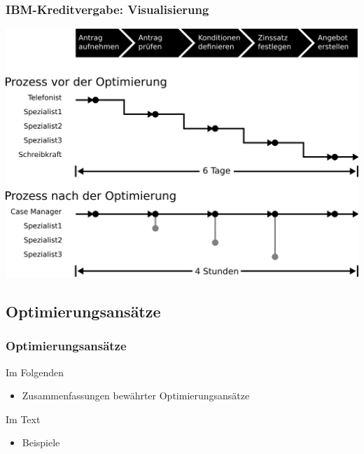 \documentclass{beamer}
\begin{document}
 \begin{frame}
  \frametitle{IBM-Kreditvergabe: Visualisierung}
  \includegraphics[scale=2.5]{4_5.png}
 \end{frame}

 \subsection{Optimierungsansätze}
 \begin{frame}
  \frametitle{Optimierungsansätze}
  Im Folgenden
  \begin{itemize}
    \item Zusammenfassungen bewährter Optimierungsansätze
  \end{itemize}
  Im Text
  \begin{itemize}
    \item Beispiele
  \end{itemize}
 \end{frame}
\end{document}
